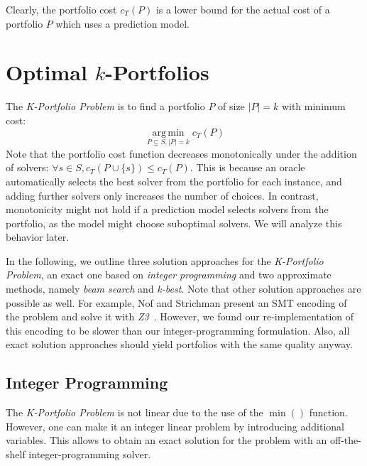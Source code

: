 \documentclass[a4paper,USenglish,pdfa]{lipics-v2021} %
\DeclareMathOperator*{\argmin}{arg\,min}
\begin{document}
Clearly, the portfolio cost $c_{T}(P)$ is a lower bound for the actual cost of a portfolio $P$ which uses a prediction model.

\section{Optimal \texorpdfstring{$k$}{k}-Portfolios} %
\label{sec:approach}

The \emph{K-Portfolio Problem} is to find a portfolio $P$ of size $|P| = k$ with minimum cost:%
\[
\argmin\limits_{P \subseteq S, |P| = k} c_{T}(P)
\]
Note that the portfolio cost function decreases monotonically under the addition of solvers: $\forall s \in S, c_{T}(P \cup \{s\}) \leq c_{T}(P)$. 
This is because an oracle automatically selects the best solver from the portfolio for each instance, and adding further solvers only increases the number of choices.
In contrast, monotonicity might not hold if a prediction model selects solvers from the portfolio, as the model might choose suboptimal solvers.
We will analyze this behavior later.

In the following, we outline three solution approaches for the \emph{K-Portfolio Problem}, an exact one based on \emph{integer programming} and two approximate methods, namely \emph{beam search} and \emph{k-best}. 
Note that other solution approaches are possible as well.
For example, Nof and Strichman present an SMT encoding of the problem and solve it with \emph{Z3}~\cite{nof2020real}.
However, we found our re-implementation of this encoding to be slower than our integer-programming formulation.
Also, all exact solution approaches should yield portfolios with the same quality anyway.

\subsection{Integer Programming}
\label{sec:approach:ip}

The \emph{K-Portfolio Problem} is not linear due to the use of the $\min()$ function.
However, one can make it an integer linear problem by introducing additional variables.
This allows to obtain an exact solution for the problem with an off-the-shelf integer-programming solver.
\end{document}
